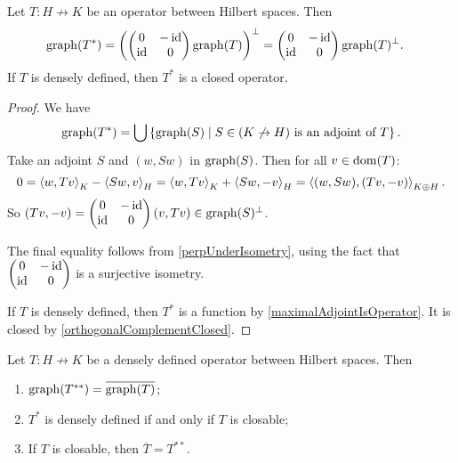 \begin{proposition} \label{adjointGraph}
Let $T: H\not\to K$ be an operator between Hilbert spaces. Then
\begin{align*}
\operatorname{graph}(T^*) &= \left( \begin{pmatrix}
0 & -\operatorname{id} \\ \operatorname{id} & 0
\end{pmatrix}\operatorname{graph}(T) \right)^\perp 
=  \begin{pmatrix}
0 & -\operatorname{id} \\ \operatorname{id} & 0
\end{pmatrix}\operatorname{graph}(T)^\perp.
\end{align*}
If $T$ is densely defined, then $T^*$ is a closed operator.
\end{proposition}
\begin{proof}
We have
\[ \operatorname{graph}(T^*) = \bigcup\left\{ \operatorname{graph}(S) \;\middle|\; \text{$S\in (K\not\to H)$ is an adjoint of $T$} \right\}. \]
Take an adjoint $S$ and $(w, Sw)$ in $\operatorname{graph}(S)$. Then for all $v\in\operatorname{dom}(T)$:
\[ 0 = \left\langle w, Tv \right\rangle_K - \left\langle Sw, v \right\rangle_H = \left\langle w, Tv \right\rangle_K + \left\langle Sw, -v \right\rangle_H = \left\langle (w, Sw), (Tv,-v) \right\rangle_{K\oplus H}. \]
So $(Tv,-v) = \begin{pmatrix}
0 & -\operatorname{id} \\ \operatorname{id} & 0
\end{pmatrix} (v,Tv) \in \operatorname{graph}(S)^\perp $.

The final equality follows from \ref{perpUnderIsometry}, using the fact that $\begin{pmatrix}
0 & -\operatorname{id} \\ \operatorname{id} & 0
\end{pmatrix}$ is a surjective isometry.

If $T$ is densely defined, then $T^*$ is a function by \ref{maximalAdjointIsOperator}. It is closed by \ref{orthogonalComplementClosed}.
\end{proof}
\begin{corollary} \label{adjointDenselyDefinedClosable}
Let $T: H\not\to K$ be a densely defined operator between Hilbert spaces.
Then
\begin{enumerate}
\item $\operatorname{graph}(T^{**}) = \overline{\operatorname{graph}(T)}$;
\item $T^*$ is densely defined \textup{if and only if} $T$ is closable;
\item If $T$ is closable, then $\overline{T} = T^{**}$.
\end{enumerate}
\end{corollary}
